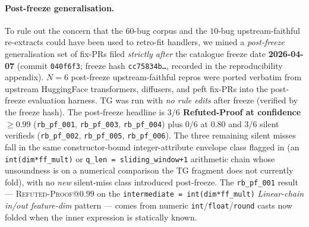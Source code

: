 \paragraph{Post-freeze generalisation.}
To rule out the concern that the $60$-bug corpus and the
$10$-bug upstream-faithful re-extracts could have been used
to retro-fit handlers, we mined a \emph{post-freeze}
generalisation set of fix-PRs filed
\emph{strictly after} the catalogue freeze date
\textbf{2026-04-07} (commit \texttt{040f6f3}; freeze hash
\texttt{cc75834b\ldots}, recorded in the reproducibility
appendix).
$N{=}6$ post-freeze upstream-faithful repros were ported
verbatim from upstream HuggingFace transformers, diffusers,
and peft fix-PRs into the post-freeze evaluation harness.
TG was run with
\emph{no rule edits} after freeze (verified by the freeze
hash). The post-freeze headline is
\textbf{$3/6$ Refuted-Proof at confidence $\ge 0.99$}
(\texttt{rb\_pf\_001}, \texttt{rb\_pf\_003}, \texttt{rb\_pf\_004})
plus $0/6$ at $0.80$ and $3/6$ silent verifieds
(\texttt{rb\_pf\_002}, \texttt{rb\_pf\_005}, \texttt{rb\_pf\_006}).
The three remaining silent misses fall in the same
constructor-bound integer-attribute envelope class flagged
in  (an \texttt{int(dim*ff\_mult)} or
\texttt{q\_len = sliding\_window+1} arithmetic chain whose
unsoundness is on a numerical comparison the
\textsc{TG} fragment does not currently fold), with no
\emph{new} silent-miss class introduced post-freeze.
The \texttt{rb\_pf\_001} result --- \textsc{Refuted-Proof}@$0.99$
on the \texttt{intermediate = int(dim*ff\_mult)} \emph{Linear-chain
in/out feature-dim} pattern --- comes from numeric
\texttt{int}/\texttt{float}/\texttt{round} casts now
folded when the inner expression
is statically known.

